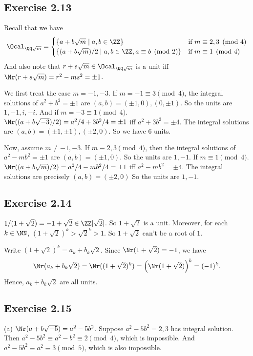 \documentclass[../Chapter.tex]{subfiles}
\begin{document}
\subsection*{Exercise 2.13}

Recall that we have
$$
\Ocal_{\QQ\sqrt{m}}=
\begin{cases}
\{ a+b\sqrt{m}\mid a,b\in\ZZ \} & \text{if } m \equiv 2,3 \pmod{4}\\
\{ (a+b\sqrt{m})/2 \mid a,b\in\ZZ,a \equiv b \pmod{2} \} & \text{if } m \equiv 1 \pmod{4}
\end{cases}
$$
And also note that $r+s\sqrt{m}\in \Ocal_{\QQ\sqrt{m}}$ is a unit iff $\Nr(r+s\sqrt{m})=r^2-ms^2=\pm1$.

We first treat the case $m=-1,-3$. If $m=-1 \equiv 3 \pmod{4}$, the integral solutions of $a^2+b^2=\pm1$ are $(a,b)=(\pm1,0),(0,\pm1)$. So the units are $1,-1,i,-i$. And if $m=-3 \equiv 1 \pmod{4}$. $\Nr((a+b\sqrt{-3})/2)=a^2/4+3b^2/4=\pm1$ iff $a^2+3b^2=\pm4$. The integral solutions are $(a,b)=(\pm1,\pm1),(\pm2,0)$. So we have 6 units.

Now, assume $m\neq-1,-3$. If $m \equiv 2,3 \pmod{4}$, then the integral solutions of $a^2-mb^2=\pm1$ are $(a,b)=(\pm1,0)$. So the units are $1,-1$. If $m \equiv 1 \pmod{4}$. $\Nr((a+b\sqrt{m})/2)=a^2/4-mb^2/4=\pm1$ iff $a^2-mb^2=\pm4$. The integral solutions are precisely $(a,b)=(\pm2,0)$ So the units are $1,-1$.

\subsection*{Exercise 2.14}

$1/(1+\sqrt{2})=-1+\sqrt{2}\in \ZZ[\sqrt{2}]$. So $1+\sqrt{2}$ is a unit. Moreover, for each $k\in\NN$, $(1+\sqrt{2})^k>\sqrt{2}^k>1$. So $1+\sqrt{2}$ can't be a root of $1$.

Write $(1+\sqrt{2})^k=a_k+b_k\sqrt{2}$. Since $\Nr(1+\sqrt{2})=-1$, we have $$\Nr(a_k+b_k\sqrt{2})=\Nr((1+\sqrt{2})^k)=\left(\Nr(1+\sqrt{2})\right)^k=(-1)^k.$$ Hence, $a_k+b_k\sqrt{2}$ are all units.

\subsection*{Exercise 2.15}

(a) $\Nr(a+b\sqrt{-5})=a^2-5b^2$. Suppose $a^2-5b^2=2,3$ has integral solution. Then $a^2-5b^2 \equiv a^2-b^2 \equiv 2 \pmod{4}$, which is impossible. And $a^2-5b^2 \equiv a^2 \equiv 3 \pmod{5}$, which is also impossible.
\end{document}
